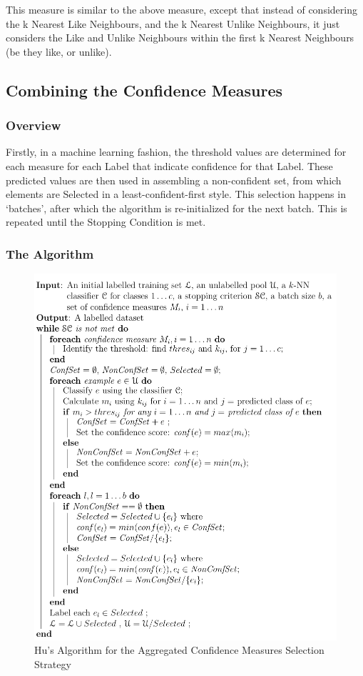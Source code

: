\documentclass[a4paper,11pt]{report}
\begin{document}
This measure is similar to the above measure, except that instead of considering the k Nearest Like Neighbours, and the k Nearest Unlike Neighbours, it just considers the Like and Unlike Neighbours within the first k Nearest Neighbours (be they like, or unlike).

\subsection{Combining the Confidence Measures}

\subsubsection{Overview}
Firstly, in a machine learning fashion, the threshold values are determined for each measure for each Label that indicate confidence for that Label. These predicted values are then used in assembling a non-confident set, from which elements are Selected in a least-confident-first style. This selection happens in `batches', after which the algorithm is re-initialized for the next batch. This is repeated until the Stopping Condition is met.

\pagebreak

\begin{samepage}

\subsubsection{The Algorithm}
\begin{figure}[h!]
\includegraphics[scale=0.75]{./Others/Hu2011AggregrateAlgorithm}
\caption{Hu's Algorithm for the Aggregated Confidence Measures Selection Strategy}
\end{figure}
\end{samepage}
\end{document}
